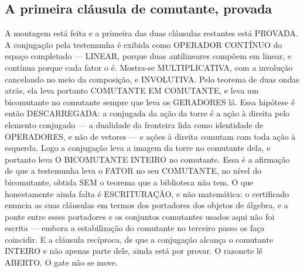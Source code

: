 \documentclass[11pt]{article}
\theoremstyle{definition}\newtheorem{deriv}{Derivação}
\begin{document}
\subsection*{A primeira cl\'ausula de comutante, provada}A montagem est\'a feita e a primeira das duas cl\'ausulas restantes est\'a PROVADA. A conjuga\c{c}\~ao pela testemunha \'e exibida como OPERADOR CONT\'INUO do espa\c{c}o completado --- LINEAR, porque duas antilineares comp\~oem em linear, e cont\'inua porque cada fator o \'e. Mostra-se MULTIPLICATIVA, com a involu\c{c}\~ao cancelando no meio da composi\c{c}\~ao, e INVOLUTIVA. Pelo teorema de duas ondas atr\'as, ela leva portanto COMUTANTE EM COMUTANTE, e leva um bicomutante no comutante sempre que leva os GERADORES l\'a. Essa hip\'otese \'e ent\~ao DESCARREGADA: a conjugada da a\c{c}\~ao da torre \'e a a\c{c}\~ao \`a direita pelo elemento conjugado --- a dualidade da fronteira lida como identidade de OPERADORES, e n\~ao de vetores --- e a\c{c}\~oes \`a direita comutam com toda a\c{c}\~ao \`a esquerda. Logo a conjuga\c{c}\~ao leva a imagem da torre no comutante dela, e portanto leva O BICOMUTANTE INTEIRO no comutante. Essa \'e a afirma\c{c}\~ao de que a testemunha leva o FATOR no seu COMUTANTE, no n\'ivel do bicomutante, obtida SEM o teorema que a biblioteca n\~ao tem. O que honestamente ainda falta \'e ESCRITURA\c{C}\~AO, e n\~ao matem\'atica: o certificado enuncia as suas cl\'ausulas em termos dos portadores dos objetos de \'algebra, e a ponte entre esses portadores e os conjuntos comutantes usados aqui n\~ao foi escrita --- embora a estabiliza\c{c}\~ao do comutante no terceiro passo os fa\c{c}a coincidir. E a cl\'ausula rec\'iproca, de que a conjuga\c{c}\~ao alcan\c{c}a o comutante INTEIRO e n\~ao apenas parte dele, ainda est\'a por provar. O razonete l\^e ABERTO. O gate n\~ao se move.
\end{document}
